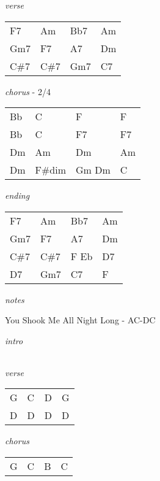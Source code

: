 \documentclass[12pt]{article}
\begin{document}
\textit{verse}

\begin{tabular}{|P{1.25in}|P{1.25in}|P{1.25in}|P{1.25in}|}
  F7   &  Am  & Bb7  &  Am \\
  Gm7  &  F7  & A7   &  Dm \\
  C\#7 &  C\#7 & Gm7 & C7  \\
\end{tabular}

\textit{chorus} - 2/4

\begin{tabular}{|P{1.25in}|P{1.25in}|P{1.25in}|P{1.25in}|}
  Bb &  C & F  &  F \\
  Bb &  C & F7 &  F7 \\
  Dm & Am & Dm & Am \\
  Dm & F\#dim & Gm Dm & C \\
\end{tabular}

\textit{ending}

\begin{tabular}{|P{1.25in}|P{1.25in}|P{1.25in}|P{1.25in}|}
  F7   &  Am  & Bb7  &  Am \\
  Gm7  &  F7  & A7   &  Dm \\
  C\#7 &  C\#7 & F Eb & D7  \\
  D7   & Gm7  & C7   &  F \\
\end{tabular}

\textit{notes}

\newpage

{\Huge You Shook Me All Night Long} {\huge - \textsc{AC-DC}}

\huge
\textit{intro}

\begin{tabular}{|P{1.25in}|P{1.25in}|P{1.25in}|P{1.25in}|}

\end{tabular}

\textit{verse}

\begin{tabular}{|P{1.25in}|P{1.25in}|P{1.25in}|P{1.25in}|}
  G & C  & D &  G \\
  D & D & D & D \\
\end{tabular}

\textit{chorus}

\begin{tabular}{|P{1.25in}|P{1.25in}|P{1.25in}|P{1.25in}|}
  G & C  &  B &  C \\
\end{tabular}
\end{document}
